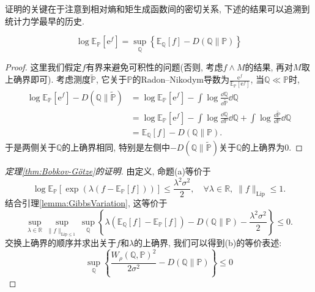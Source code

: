 证明的关键在于注意到相对熵和矩生成函数间的密切关系, 下述的结果可以追溯到统计力学最早的历史. 
\begin{lemma}[Gibbs变分原理]\label{lemma:GibbsVariation}
	\begin{equation*}
		\log \mathbb{E}_{\mathbb{P}}[\mathrm{e}^f] = \sup_{\mathbb{Q}} \left\{ \mathbb{E}_{\mathbb{Q}} [f] - D(\mathbb{Q} \| \mathbb{P}) \right\}
	\end{equation*}
\end{lemma}
\begin{proof}
	这里我们假定$f$有界来避免可积性的问题(否则, 考虑$f \wedge M$的结果, 再对$M$取上确界即可). 
	考虑测度$\tilde{\mathbb{P}}$, 它关于$\mathbb{P}$的Radon–Nikodym导数为$\frac{\mathrm{e}^{f}}{\mathbb{E}_{\mathbb{P}}[\mathrm{e}^{f}]}$, 当$\mathbb{Q} \ll \mathbb{P}$时, 
	\begin{align*}
		\log \mathbb{E}_{\mathbb{P}}[\mathrm{e}^f] - D(\mathbb{Q} \| \tilde{\mathbb{P}})
		&= \log \mathbb{E}_{\mathbb{P}}[\mathrm{e}^f] - \int \log \frac{\dd \mathbb{Q}}{\dd \tilde{\mathbb{P}}} \dd \mathbb{Q} \\
		&= \log \mathbb{E}_{\mathbb{P}}[\mathrm{e}^f] - \int \log \frac{\dd \mathbb{Q}}{\dd \mathbb{P}} \dd \mathbb{Q} + \int \log \frac{\dd \tilde{\mathbb{P}}}{\dd \mathbb{P}} \dd \mathbb{Q} \\
		&= \mathbb{E}_{\mathbb{Q}}[f] - D(\mathbb{Q} \| \mathbb{P}). 
	\end{align*}
	于是两侧关于$\mathbb{Q}$的上确界相同, 特别是左侧中$- D(\mathbb{Q} \| \tilde{\mathbb{P}})$关于$\mathbb{Q}$的上确界为$0$.   
\end{proof}

\begin{proof}[\keben 定理\ref{thm:Bobkov-Götze}的证明]%
	由定义, 命题(a)等价于
	\begin{equation*}
		\log \mathbb{E}_{\mathbb{P}} [\exp(\lambda(f - \mathbb{E}_{\mathbb{P}}[f]))] \leq \frac{\lambda^2 \sigma^2}{2}, 
		\quad \forall \lambda \in \mathbb{R},\; \|f\|_{\text{Lip}} \leq 1. 
	\end{equation*}
	结合引理\ref{lemma:GibbsVariation}, 这等价于
	\begin{equation*}
		\sup_{\lambda \in \mathbb{R}} \sup_{\|f\|_{\text{Lip} \leq 1}} \sup_{\mathbb{Q}} \left\{\lambda(\mathbb{E}_{\mathbb{Q}}[f] - \mathbb{E}_{\mathbb{P}}[f]) - D(\mathbb{Q} \| \mathbb{P}) -  \frac{\lambda^2 \sigma^2}{2} \right\} \leq 0. 
	\end{equation*}
	交换上确界的顺序并求出关于$f$和$\lambda$的上确界, 我们可以得到(b)的等价表述: 
	\begin{equation*}
		\sup_{\mathbb{Q}} \left\{\frac{W_{\rho}(\mathbb{Q}, \mathbb{P})^2}{2 \sigma^2} - D(\mathbb{Q} \| \mathbb{P}) \right\} \leq 0
	\end{equation*}
\end{proof}

